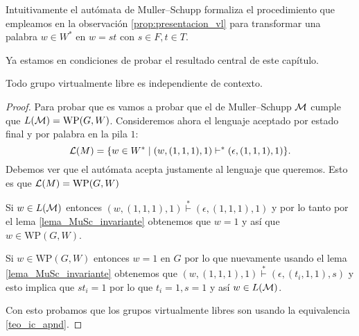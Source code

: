 \documentclass[tesis.tex]{subfiles}
\begin{document}
	
	Intuitivamente el autómata de Muller--Schupp formaliza el procedimiento que empleamos en la observación \ref{prop:presentacion_vl} para transformar una palabra $w \in W^*$ en $w = st$ con $s \in F, t \in T$.
	
	Ya estamos en condiciones de probar el resultado central de este capítulo.

\begin{teo}\label{teo_Muller_Schupp}\cite{muller1983groups}
	Todo grupo virtualmente libre es independiente de contexto.
\end{teo}

\begin{proof}
	Para probar que es \ic vamos a probar que el \APD de Muller--Schupp $\cal M$ cumple que $L({\cal M})= \text{WP}(G,W)$.
	Consideremos ahora el lenguaje aceptado por estado final y por palabra en la pila $1$:
	\[
	{\cal L }(M) = \{  w \in W^* \mid (w,(1,1,1),1)   \vdash^*  (\epsilon, (1,1,1), 1)  \}.
	\]
	Debemos ver que el autómata acepta justamente al lenguaje que queremos. 
	Esto es que $ {\cal L }(M) = \text{WP}(G,W) $ 
	
	Si $w \in L(\cal M)$ entonces $(w, (1,1,1), 1) \overset{*}{\vdash} (\epsilon, (1,1,1), 1)$ y por lo tanto por el lema \ref{lema_MuSc_invariante} obtenemos que $w = 1$ y así que $w \in \text{WP}(G,W)$.
	
	Si $w \in \text{WP}(G,W)$ entonces $w = 1$ en $G$ por lo que nuevamente usando el lema \ref{lema_MuSc_invariante} obtenemos que $(w, (1,1,1), 1) \overset{*}{\vdash} (\epsilon, (t_{i},1,1), s)$
	y esto implica que $st_{i} = 1$ por lo que $t_{i} = 1, s =1$ y así $w \in L(\cal M)$.
	
	
	Con esto probamos que los grupos virtualmente libres son \ic usando la equivalencia \ref{teo_ic_apnd}.
	
\end{proof}
\end{document}
